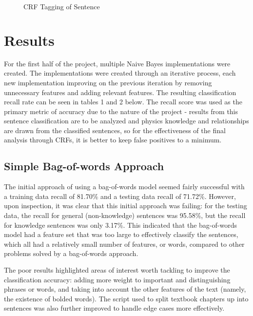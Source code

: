 \documentclass{article} %
\begin{document}
\begin{figure}[H]
\centering
{}
\caption{CRF Tagging of Sentence}
\label{fig:crf-example}
\end{figure}

\section{Results}

For the first half of the project, multiple Naive Bayes implementations were created. The implementations were created through an iterative process, each new implementation improving on the previous iteration by removing unnecessary features and adding relevant features. The resulting classification recall rate can be seen in tables 1 and 2 below. The recall score was used as the primary metric of accuracy due to the nature of the project - results from this sentence classification are to be analyzed and physics knowledge and relationships are drawn from the classified sentences, so for the effectiveness of the final analysis through CRFs, it is better to keep false positives to a minimum.

\subsection{Simple Bag-of-words Approach}

The initial approach of using a bag-of-words model seemed fairly successful with a training data recall of 81.70\% and a testing data recall of 71.72\%. However, upon inspection, it was clear that this initial approach was failing: for the testing data, the recall for general (non-knowledge) sentences was 95.58\%, but the recall for knowledge sentences was only 3.17\%. This indicated that the bag-of-words model had a feature set that was too large to effectively classify the sentences, which all had a relatively small number of features, or words, compared to other problems solved by a bag-of-words approach.

The poor results highlighted areas of interest worth tackling to improve the classification accuracy: adding more weight to important and distinguishing phrases or words, and taking into account the other features of the text (namely, the existence of bolded words). The script used to split textbook chapters up into sentences was also further improved to handle edge cases more effectively.
\end{document}
